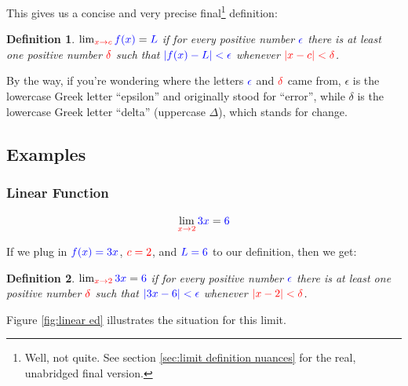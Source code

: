 \documentclass{myarticle}
\newcommand{\hor}[1]{\textcolor{red}{#1}}
\newcommand{\ver}[1]{\textcolor{blue}{#1}}
\theoremstyle{nospace}
\newtheorem*{oldattempt}{Definition}
\newenvironment{attempt}
{\begin{mdframed}\begin{oldattempt}}
    {\end{oldattempt}\end{mdframed}}
\newtheorem{old series theorem}{Theorem}
\newenvironment{series theorem}
{\begin{mdframed}\begin{old series theorem}}
    {\end{old series theorem}\end{mdframed}}
\begin{document}
This gives us a concise and very precise final\footnote{Well, not
  quite. See section \ref{sec:limit definition nuances} for the real,
  unabridged final version.} definition:

\begin{attempt}
  $\lim_{\hor{x \to c}} \ver{f(x)} = \ver{L}$ if for every positive
  number $\ver{\epsilon}$ there is at least one positive number
  $\hor{\delta}$ such that $\ver{|f(x) - L| < \epsilon}$ whenever
  $\hor{|x - c| < \delta}$.
\end{attempt}

By the way, if you're wondering where the letters $\ver{\epsilon}$ and
$\hor{\delta}$ came from, $\epsilon$ is the lowercase Greek letter
``epsilon'' and originally stood for ``error'', while $\delta$ is the
lowercase Greek letter ``delta'' (uppercase $\Delta$), which stands
for change.

\subsection{Examples}
\label{sec:limit definition examples}

\subsubsection{Linear Function}
\label{sec:linear function}

\[
  \lim_{\hor{x \to 2}} \ver{3x} = \ver{6}
\]

If we plug in $\ver{f(x) = 3x}$, $\hor{c = 2}$, and $\ver{L = 6}$ to
our definition, then we get:

\begin{attempt}
  $\lim_{\hor{x \to 2}} \ver{3x} = \ver{6}$ if for every positive
  number $\ver{\epsilon}$ there is at least one positive number
  $\hor{\delta}$ such that $\ver{|3x - 6| < \epsilon}$ whenever
  $\hor{|x - 2| < \delta}$.
\end{attempt}

Figure \ref{fig:linear ed} illustrates the situation for this limit.
\end{document}
